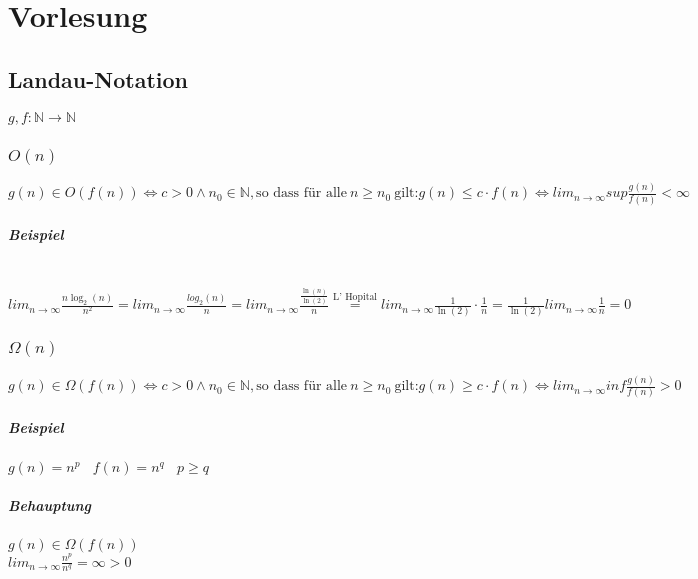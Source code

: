 \chapter{Vorlesung}


\section{Landau-Notation}

$g, f : \mathbb{N} \rightarrow \mathbb{N}$

\subsection{$O(n)$}
$g(n) \in O(f(n)) \Leftrightarrow c > 0 \land n_0 \in \mathbb{N}, \text{so dass für alle}~n \geq n_0~\text{gilt:} g(n) \leq c \cdot f(n) \Leftrightarrow lim_{n \rightarrow \infty} sup \frac{g(n)}{f(n)} < \infty$
\paragraph{Beispiel} \text{} \\
$lim_{n \rightarrow \infty} \frac{n \log_2(n)}{n^2} = lim_{n \rightarrow \infty} \frac{log_2(n)}{n} = lim_{n \rightarrow \infty} \frac{\frac{\ln(n)}{\ln(2)}}{n} \stackrel{\text{L' Hopital}}{=} lim_{n \rightarrow \infty} \frac{1}{\ln(2)} \cdot \frac{1}{n} = \frac{1}{\ln(2)} lim_{n \rightarrow \infty} \frac{1}{n} = 0$\\



\subsection{$\Omega(n)$}
$g(n) \in \Omega(f(n)) \Leftrightarrow c > 0 \land n_0 \in \mathbb{N}, \text{so dass für alle}~n \geq n_0~\text{gilt:} g(n) \geq c \cdot f(n) \Leftrightarrow lim_{n \rightarrow \infty} inf \frac{g(n)}{f(n)} > 0$
\paragraph{Beispiel} $g(n) = n^p~~~~f(n)=n^q~~~~p \geq q$
\paragraph{Behauptung} $g(n) \in \Omega(f(n))$\\

$lim_{n \rightarrow \infty} \frac{n^p}{n^q} = \infty > 0$\\


